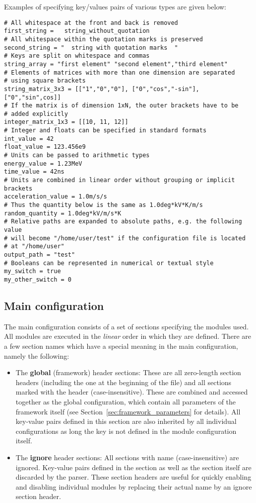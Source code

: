 Examples of specifying key/values pairs of various types are given below:
\begin{verbatim}
# All whitespace at the front and back is removed
first_string =   string_without_quotation
# All whitespace within the quotation marks is preserved
second_string = "  string with quotation marks  "
# Keys are split on whitespace and commas
string_array = "first element" "second element","third element"
# Elements of matrices with more than one dimension are separated
# using square brackets
string_matrix_3x3 = [["1","0","0"], ["0","cos","-sin"], ["0","sin",cos]]
# If the matrix is of dimension 1xN, the outer brackets have to be
# added explicitly
integer_matrix_1x3 = [[10, 11, 12]]
# Integer and floats can be specified in standard formats
int_value = 42
float_value = 123.456e9
# Units can be passed to arithmetic types
energy_value = 1.23MeV
time_value = 42ns
# Units are combined in linear order without grouping or implicit brackets
acceleration_value = 1.0m/s/s
# Thus the quantity below is the same as 1.0deg*kV*K/m/s
random_quantity = 1.0deg*kV/m/s*K
# Relative paths are expanded to absolute paths, e.g. the following value
# will become "/home/user/test" if the configuration file is located
# at "/home/user"
output_path = "test"
# Booleans can be represented in numerical or textual style
my_switch = true
my_other_switch = 0
\end{verbatim}

\subsection{Main configuration}
\label{sec:main_config}
The main configuration consists of a set of sections specifying the modules used.
All modules are executed in the \emph{linear} order in which they are defined.
There are a few section names which have a special meaning in the main configuration, namely the following:
\begin{itemize}
\item The \textbf{global} (framework) header sections: These are all zero-length section headers (including the one at the beginning of the file) and all sections marked with the header \parameter{[Allpix]} (case-insensitive).
These are combined and accessed together as the global configuration, which contain all parameters of the framework itself (see Section~\ref{sec:framework_parameters} for details).
All key-value pairs defined in this section are also inherited by all individual configurations as long the key is not defined in the module configuration itself.
\item The \textbf{ignore} header sections: All sections with name \parameter{[Ignore]} (case-insensitive) are ignored.
Key-value pairs defined in the section as well as the section itself are discarded by the parser.
These section headers are useful for quickly enabling and disabling individual modules by replacing their actual name by an ignore section header.
\end{itemize}

